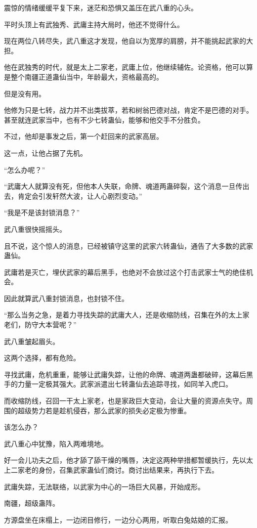 \begin{this_body}
震惊的情绪缓缓平复下来，迷茫和恐惧又盖压在武八重的心头。

平时头顶上有武独秀、武庸主持大局时，他还不觉得什么。

现在两位八转尽失，武八重这才发现，他自以为宽厚的肩膀，并不能挑起武家的大担。

他在武独秀的时代，就是太上二家老，武庸上位，他继续辅佐。论资格，他可以算是整个南疆正道蛊仙当中，年龄最大，资格最高的。

但是没有用。

他修为只是七转，战力并不出类拔萃，若和树翁巴德对战，肯定不是巴德的对手。甚至就连武家当中，也有不少七转蛊仙，能够和他交手不分胜负。

不过，他却是事发之后，第一个赶回来的武家高层。

这一点，让他占据了先机。

“怎么办呢？”

“武庸大人就算没有死，但他本人失联，命牌、魂道两蛊碎裂，这个消息一旦传出去，肯定会引发轩然大波，让人心剧烈变动。”

“我是不是该封锁消息？”

武八重很快摇摇头。

且不说，这个惊人的消息，已经被镇守这里的武家六转蛊仙，通告了大多数的武家蛊仙。

武庸若是灭亡，埋伏武家的幕后黑手，也绝对不会放过这个打击武家士气的绝佳机会。

因此就算武八重封锁消息，也封锁不住。

“那么当务之急，是着力寻找失踪的武庸大人，还是收缩防线，召集在外的太上家老们，防守大本营呢？”

武八重皱起眉头。

这两个选择，都有危险。

寻找武庸，危机重重，能够让武庸失踪，让他的命牌、魂道两蛊都破碎，这幕后黑手的力量一定极其强大。武家派遣出七转蛊仙去追踪寻找，如同羊入虎口。

而收缩防线，召回一干太上家老，也是家政巨大变动，会让大量的资源点失守。周围的超级势力若是趁机侵吞，那么武家的损失必定极为惨重。

该怎么办？

武八重心中犹豫，陷入两难境地。

好一会儿功夫之后，他才舔了舔干燥的嘴唇，决定这两种举措都暂缓执行，先以太上二家老的身份，召集武家蛊仙们商讨。商讨出结果来，再执行下去。

武庸失踪，无法联络，以武家为中心的一场巨大风暴，开始成形。

南疆，超级蛊阵。

方源盘坐在床榻上，一边闭目修行，一边分心两用，听取白兔姑娘的汇报。


\end{this_body}
